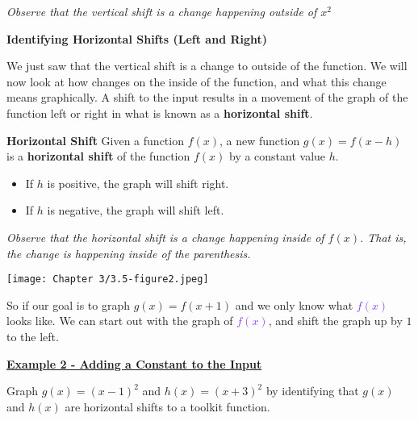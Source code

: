 \documentclass[12pt]{book}
\begin{document}
\textcolor{BrickRed}{\emph{Observe that the vertical shift is a change happening outside of $x^2$}}

\newpage

{\textbf{Identifying Horizontal Shifts (Left and Right)}}

We just saw that the vertical shift is a change to outside of the function. We will now look at how changes on the inside of the function, and what this change means graphically. A shift to the input results in a movement of the graph of the function left or right in what is known as a \textbf{horizontal shift}.
\\

\begin{boxR}
    \textbf{Horizontal Shift}
    \vspace{1mm}
    \hline 
    \vspace{2mm}
Given a function $f(x)$, a new function $g(x)=f(x-h)$ is a \textbf{horizontal shift} of the function $f(x)$ by a constant value $h$.
\begin{itemize}
    \item If $h$ is positive, the graph will shift right.
    \item If $h$ is negative, the graph will shift left.
\end{itemize} 
\textcolor{BrickRed}{\emph{Observe that the horizontal shift is a change happening inside of $f(x)$. That is, the change is happening inside of the parenthesis.}}
\end{boxR}

\centerline{\texttt{[image: Chapter 3/3.5-figure2.jpeg]}}







So if our goal is to graph \textcolor{Bittersweet}{$g(x) = f(x+1)$} and we only know what \textcolor{BlueViolet}{$f(x)$} looks like. We can start out with the graph of \textcolor{BlueViolet}{$f(x)$}, and shift the graph up by $1$ to the left.
\\



\newpage

\underline{\textbf{Example 2 - Adding a Constant to the Input}}

Graph $g(x) = (x-1)^2$ and $h(x)=(x+3)^2$ by identifying that $g(x)$ and $h(x)$ are horizontal shifts to a toolkit function.
\end{document}
